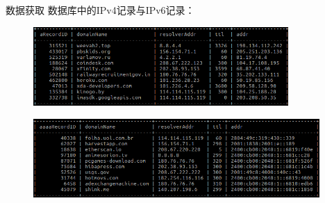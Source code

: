 \documentclass{beamer}
\begin{document}
\begin{frame}{数据获取}
  数据库中的IPv4记录与IPv6记录：
  \begin{figure}
    \includegraphics[height=3cm]{images/ipv4sjk.png}
    \end{figure}
    \begin{figure}
      \includegraphics[height=3cm]{images/ipv6sjk.png}
      \end{figure}
\end{frame}
\end{document}
